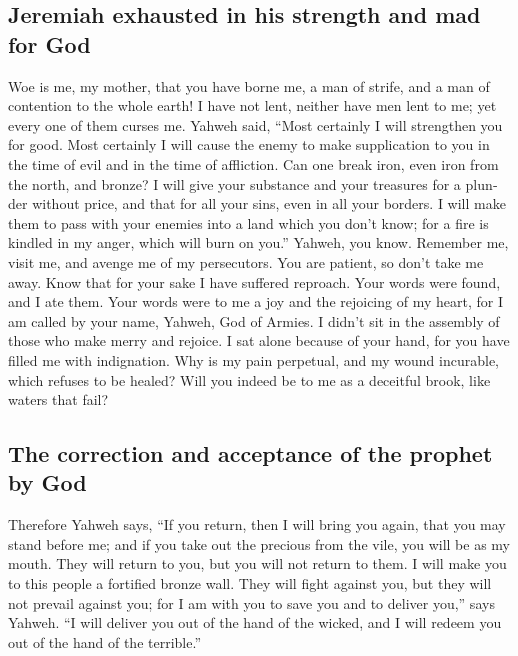\begin{paracol}{2}
\begin{otherlanguage}{english}
\hypertarget{jeremiah-exhausted-in-his-strength-and-mad-for-god}{%
\subsection{Jeremiah exhausted in his strength and mad for
God}\label{jeremiah-exhausted-in-his-strength-and-mad-for-god}}

 Woe is me, my mother, that you have borne me, a man of
strife, and a man of contention to the whole earth! I have not lent,
neither have men lent to me; yet every one of them curses me.
 Yahweh said, ``Most certainly I will strengthen you for
good. Most certainly I will cause the enemy to make supplication to you
in the time of evil and in the time of affliction.  Can
one break iron, even iron from the north, and bronze?  I
will give your substance and your treasures for a plunder without price,
and that for all your sins, even in all your borders.  I
will make them to pass with your enemies into a land which you don't
know; for a fire is kindled in my anger, which will burn on you.''
 Yahweh, you know. Remember me, visit me, and avenge me
of my persecutors. You are patient, so don't take me away. Know that for
your sake I have suffered reproach.  Your words were
found, and I ate them. Your words were to me a joy and the rejoicing of
my heart, for I am called by your name, Yahweh, God of Armies.
 I didn't sit in the assembly of those who make merry and
rejoice. I sat alone because of your hand, for you have filled me with
indignation.  Why is my pain perpetual, and my wound
incurable, which refuses to be healed? Will you indeed be to me as a
deceitful brook, like waters that fail?

\hypertarget{the-correction-and-acceptance-of-the-prophet-by-god}{%
\subsection{The correction and acceptance of the prophet by
God}\label{the-correction-and-acceptance-of-the-prophet-by-god}}

 Therefore Yahweh says, ``If you return, then I will
bring you again, that you may stand before me; and if you take out the
precious from the vile, you will be as my mouth. They will return to
you, but you will not return to them.  I will make you to
this people a fortified bronze wall. They will fight against you, but
they will not prevail against you; for I am with you to save you and to
deliver you,'' says Yahweh.  ``I will deliver you out of
the hand of the wicked, and I will redeem you out of the hand of the
terrible.''


\end{otherlanguage}
\end{paracol}
